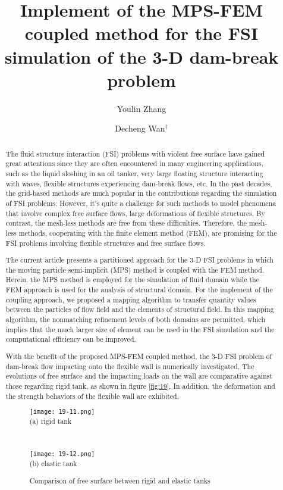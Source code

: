\documentclass[10pt]{article}
\title{Implement of the MPS-FEM coupled method for the FSI simulation of the 3-D dam-break problem}
\date{}
\author[$\relax$]{Youlin Zhang}
\author[$\relax$]{Decheng Wan$^\dagger$}
\affil[$\relax$]{State Key Laboratory of Ocean Engineering, School of Naval Architecture, Ocean and Civil Engineering, Shanghai Jiao Tong University, Collaborative Innovation Center for Advanced Ship and Deep-Sea Exploration, Shanghai 200240, China}
\affil[$\relax$]{\email{\dagger}{dcwan@sjtu.edu.cn}}
\begin{document}
\maketitle


\begin{abstract}
The fluid structure interaction (FSI) problems with violent free surface have gained great attentions since they are often encountered in many engineering applications, such as the liquid sloshing in an oil tanker, very large floating structure interacting with waves, flexible structures experiencing dam-break flows, etc. In the past decades, the grid-based methods are much popular in the contributions regarding the simulation of FSI problems. However, it's quite a challenge for such methods to model phenomena that involve complex free surface flows, large deformations of flexible structures. By contrast, the mesh-less methods are free from these difficulties. Therefore, the mesh-less methods, cooperating with the finite element method (FEM), are promising for the FSI problems involving flexible structures and free surface flows.

The current article presents a partitioned approach for the 3-D FSI problems in which the moving particle semi-implicit (MPS) method is coupled with the FEM method. Herein, the MPS method is employed for the simulation of fluid domain while the FEM approach is used for the analysis of structural domain. For the implement of the coupling approach, we proposed a mapping algorithm to transfer quantity values between the particles of flow field and the elements of structural field. In this mapping algorithm, the nonmatching refinement levels of both domains are permitted, which implies that the much larger size of element can be used in the FSI simulation and the computational efficiency can be improved.

With the benefit of the proposed MPS-FEM coupled method, the 3-D FSI problem of dam-break flow impacting onto the flexible wall is numerically investigated. The evolutions of free surface and the impacting loads on the wall are comparative against those regarding rigid tank, as shown in figure \ref{fig:19}. In addition, the deformation and the strength behaviors of the flexible wall are exhibited.

\begin{figure}[!htb]
\begin{minipage}[b]{0.46\linewidth}
\centering
\texttt{[image: 19-11.png]}\\
(a) rigid tank
\end{minipage}
\begin{minipage}[b]{0.05\linewidth}
~
\end{minipage}
\begin{minipage}[b]{0.46\linewidth}
\centering
\texttt{[image: 19-12.png]}\\
(b) elastic tank
\end{minipage}
\caption{Comparison of free surface between rigid and elastic tanks}\label{fig:19}
\end{figure}

\end{abstract}



\addbib
\end{document}
